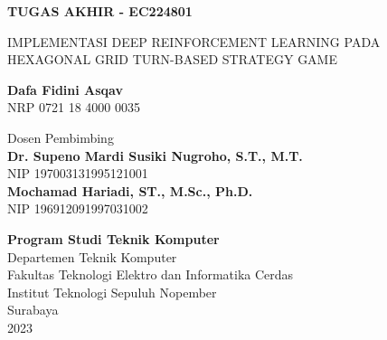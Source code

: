 \begin{flushleft}
  \fontsize{14pt}{17}
  \selectfont
  \textbf{TUGAS AKHIR - EC224801}
\end{flushleft}

\vspace{5ex}

\begin{flushleft}
  \fontsize{18pt}{22}
  \selectfont
  IMPLEMENTASI DEEP REINFORCEMENT LEARNING PADA 
  HEXAGONAL GRID TURN-BASED STRATEGY GAME
\end{flushleft}

\vspace{6ex}

\begin{flushleft}
  \fontsize{14pt}{17}
  \selectfont
  \textbf{Dafa Fidini Asqav}
  \\
  NRP 0721 18 4000 0035
\end{flushleft}

\vspace{6ex}

\begin{flushleft}
  \fontsize{14pt}{17}
  \selectfont
  Dosen Pembimbing \\
  \textbf{Dr. Supeno Mardi Susiki Nugroho, S.T., M.T.} \\
  NIP 197003131995121001 \\
  \textbf{Mochamad Hariadi, ST., M.Sc., Ph.D.} \\
  NIP 196912091997031002 \\
\end{flushleft}

\vspace{6ex}

\begin{flushleft}
  \fontsize{12pt}{15}
  \selectfont
  \textbf{Program Studi Teknik Komputer}\\
  Departemen Teknik Komputer\\
  Fakultas Teknologi Elektro dan Informatika Cerdas\\
  Institut Teknologi Sepuluh Nopember\\
  Surabaya\\
  2023
\end{flushleft}
